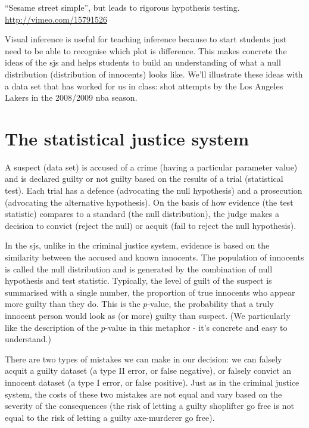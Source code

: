 \documentclass[oneside]{article}
\begin{document}
``Sesame street simple'', but leads to rigorous hypothesis testing. \url{http://vimeo.com/15791526}

Visual inference is useful for teaching inference because to start students just need to be able to recognise which plot is difference.  This makes concrete the ideas of the {\sc sjs} and helps students to build an understanding of what a null distribution (distribution of innocents) looks like.  We'll illustrate these ideas with a data set that has worked for us in class: shot attempts by the Los Angeles Lakers in the 2008/2009 {\sc nba} season.

\section{The statistical justice system}

A suspect (data set) is accused of a crime (having a particular parameter value) and is declared guilty or not guilty based on the results of a trial (statistical test). Each trial has a defence (advocating the null hypothesis) and a prosecution (advocating the alternative hypothesis). On the basis of how evidence (the test statistic) compares to a standard (the null distribution), the judge makes a decision to convict (reject the null) or acquit (fail to reject the null hypothesis).

In the {\sc sjs}, unlike in the criminal justice system, evidence is based on the similarity between the accused and known innocents. The population of innocents is called the null distribution and is generated by the combination of null hypothesis and test statistic. Typically, the level of guilt of the suspect is summarised with a single number, the proportion of true innocents who appear more guilty than they do. This is the $p$-value, the probability that a truly innocent person would look as (or more) guilty than suspect.  (We particularly like the description of the $p$-value in this metaphor - it's concrete and easy to understand.)

There are two types of mistakes we can make in our decision: we can falsely acquit a guilty dataset (a type II error, or false negative), or falsely convict an innocent dataset (a type I error, or false positive). Just as in the criminal justice system, the costs of these two mistakes are not equal and vary based on the severity of the consequences (the risk of letting a guilty shoplifter go free is not equal to the risk of letting a guilty axe-murderer go free). 
\end{document}
